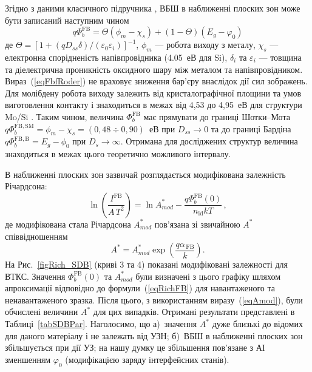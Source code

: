 \documentclass[a4paper,14pt,oneside,openany]{memoir}
\begin{document}
Згідно з даними класичного підручника \cite{Rhoderick1988},
ВБШ в наближенні плоских зон може бути записаний наступним чином
\begin{equation}
\label{eqFbfRoder}
    q\Phi_{b}^\mathrm{FB}=\Theta(\phi_m-\chi_s)+(1-\Theta)(E_g-\varphi_0)
\end{equation}
де $\Theta=[1+(qD_{ss}\delta)/(\varepsilon_0\varepsilon_i)]^{-1}$,
$\phi_m$ --- робота виходу з металу,
$\chi_s$ --- електронна спорідненість напівпровідника (4.05~еВ для Si),
$\delta_i$ та $\varepsilon_i$ --- товщина та діелектрична проникність оксидного шару між металом та напівпровідником.
Вираз~(\ref{eqFbfRoder}) не враховує зниження бар'єру внаслідок дії сил зображень.
Для молібдену робота виходу залежить від кристалографічної площини та умов виготовлення контакту
і знаходиться в межах від 4,53 до 4,95~еВ для структури Mo/Si \cite{MoWF2002}.
Таким чином, величина $\Phi_{b}^\mathrm{FB}$ має прямувати до границі Шотки--Мота
$q\Phi_{b}^\mathrm{FB,SM}=\phi_m-\chi_s=(0,48\div0,90)$~еВ при $D_{ss}\rightarrow0$
та до границі Бардіна $q\Phi_{b}^\mathrm{FB,B}=E_g-\phi_0$ при $D_s\rightarrow\infty$.
Отримана для досліджених структур величина знаходиться в межах цього теоретично можливого інтервалу.

В наближенні плоских зон зазвичай розглядається модифікована залежність Річардсона:
\begin{equation}
\label{eqRichFB}
\ln\left(\frac{I^\mathrm{FB}}{A\,T^2}\right)=\ln A^*_{mod}-\frac{q\Phi_{b}^\mathrm{FB}(0)}{n_\mathrm{id}kT}\,,
\end{equation}
де модифікована стала Річардсона $A^*_{mod}$  пов'язана зі звичайною $A^*$  співвідношенням
\begin{equation}
\label{eqAmod}
A^*=A^*_{mod}\exp\left(\frac{q\alpha_\mathrm{\,FB}}{k}\right).
\end{equation}
На Рис.~\ref{figRich_SDB} (криві 3 та 4) показані модифіковані залежності для ВТКС.
Значення $\Phi_{b}^\mathrm{FB}(0)$ та $A^*_{mod}$ були визначені з цього графіку шляхом апроксимації відповідно до формули~(\ref{eqRichFB})
для навантаженого та ненавантаженого зразка.
Після цього, з використанням виразу~(\ref{eqAmod}), були обчислені величини $A^*$ для цих випадків.
Отримані результати представлені в Таблиці~\ref{tabSDBPar}.
Наголосимо, що
а)~значення $A^*$ дуже близькі до відомих для даного матеріалу і не залежать від УЗН;
б)~ВБШ в наближенні плоских зон збільшується при дії УЗ;
на нашу думку це збільшення пов'язане з АІ зменшенням $\varphi_0$ (модифікацією заряду інтерфейсних станів).
\end{document}
